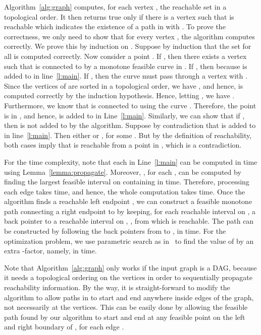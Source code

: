 \documentclass[12pt]{dalthesis}
\def\favoritefont{\bfseries \sffamily}
\def\QED{\ensuremath{{\Box}}}
\def\markatright#1{\leavevmode\unskip\nobreak\quad\hspace*{\fill}{#1}}
\newenvironment{proof}
	{\begin{trivlist}\item[\hskip\labelsep{\favoritefont Proof:}]}
	{\markatright{\QED}\end{trivlist}}
\newcommand{\qed}{}
\begin{document}
\begin{proof}
	Algorithm~\ref{alg:graph} computes, for each vertex ,
	the reachable set  in a topological order.
	It then returns true only if there is a vertex  such that  is reachable
	which indicates the existence of a path  in  with .
	To prove the correctness, we only need to show that 
	for every vertex , the algorithm computes  correctly.
	We prove this by induction on .
	Suppose by induction that the set 
	for all  is computed correctly.
	Now consider a point .
	If , then there exists a vertex  such that
	 is connected to  by a monotone feasible curve  in .
	If , then  because
	 is added to  in line~\ref{l:main}.
	If , then the curve  must pass through a vertex  with .
	Since the vertices of  are sorted in a topological order,
	we have , and hence,  is computed correctly by the induction hypothesis.
	Hence, letting , we have .
	Furthermore, we know that  is connected to  using the curve .
	Therefore, the point  is in ,
	and hence, is added to  in Line~\ref{l:main}.
	Similarly, we can show that if ,
	then  is not added to  by the algorithm.
	Suppose by contradiction that  is added to  in line~\ref{l:main}.
	Then either  or
	, for some .
	But by the definition of reachability, both cases imply that 
	 is reachable from a point in ,
	which is a contradiction.
	
	For the time complexity, 
	note that each  in Line~\ref{l:main} can be computed in 
	 time using Lemma~\ref{lemma:propagate}. 
	Moreover, , for each , can be computed
	by finding the largest feasible interval on  containing 
	in  time.
	Therefore, processing each edge  takes  time,
	and hence, the whole computation takes  time.
	Once the algorithm finds a reachable left endpoint ,
	we can construct a feasible monotone path connecting a right endpoint  to 
	by keeping, for each reachable interval  on , a back pointer to a reachable interval  on , ,
	from which  is reachable. 
	The path  can be constructed 
	by following the back pointers from  to , in  time.
	For the optimization problem, we use parametric search as in~\cite{AltERW03a,AltG95}
	to find the value of  by an extra -factor,
	namely, in  time.
	\qed
\end{proof}
Note that Algorithm~\ref{alg:graph} only works if the input graph is a DAG,
because it needs a topological ordering on the vertices in order to 
sequentially propagate reachability information.  
By the way, it is straight-forward 
to modify the algorithm to allow paths in 
to start and end anywhere inside edges of the graph, 
not necessarily at the vertices. 
This can be easily done by allowing 
the feasible path found by our algorithm
to start and end at any feasible point 
on the left and right boundary of ,
for each edge .
\end{document}
